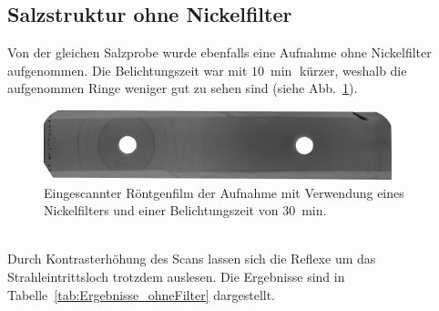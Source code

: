 \documentclass[a4paper,twoside,final]{article}
\begin{document}
\FloatBarrier
\subsection{Salzstruktur ohne Nickelfilter}
Von der gleichen Salzprobe wurde ebenfalls eine Aufnahme ohne Nickelfilter aufgenommen. Die Belichtungszeit war mit $\SI{10}{\min}$ kürzer, weshalb die aufgenommen Ringe weniger gut zu sehen sind (siehe Abb.~\ref{fig:Film_ohneFilter}).
\begin{figure}[htp]
    \centering
        \includegraphics[width=0.9\textwidth]{Abbildungen/Roentgenfilm_ohne_Filter.jpg}
    \caption{Eingescannter Röntgenfilm der Aufnahme mit Verwendung eines Nickelfilters und einer Belichtungszeit von \SI{30}{\minute}.}
    \label{fig:Film_ohneFilter}
\end{figure}\\
Durch Kontrasterhöhung des Scans lassen sich die Reflexe um das Strahleintrittsloch trotzdem auslesen. Die Ergebnisse sind in Tabelle~\ref{tab:Ergebnisse_ohneFilter} dargestellt.
\end{document}

